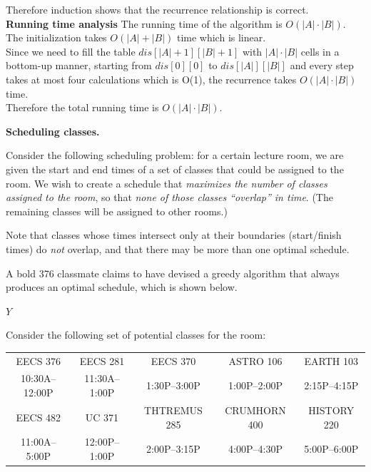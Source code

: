 \documentclass[11pt,addpoints]{exam}
\begin{document}
\begin{questions}
\begin{solution}
    Therefore induction shows that the recurrence relationship is correct.\\

    \textbf{Running time analysis}
    The running time of the algorithm is $O(|A| \cdot |B|)$.
    The initialization takes $O(|A|+|B|)$ time which is linear.\\
    Since we need to fill the table $dis[|A|+1][|B|+1]$ with $|A| \cdot |B|$ cells in a bottom-up manner, starting from $dis[0][0]$ to $dis[|A|][|B|]$ and every step takes at most four calculations which is O(1), the recurrence takes $O(|A| \cdot |B|)$ time. \\
    Therefore the total running time is $O(|A| \cdot |B|)$.
    \end{solution}

\question \textbf{Scheduling classes.}

Consider the following scheduling problem: for a certain lecture room, we are given the start and end times of a set of classes that could be assigned to the room.
  We wish to create a schedule that \emph{maximizes the number of classes assigned to the room}, so that \emph{none of those classes ``overlap'' in time}.
  (The remaining classes will be assigned to other rooms.)

  Note that classes whose times intersect only at their boundaries (start/finish times) do \emph{not} overlap, and that there may be more than one optimal schedule.
  
  A bold 376 classmate claims to have devised a greedy algorithm that always produces an optimal schedule, which is shown below.

  \begin{minipage}{\linewidth}
    \begin{algorithm}[H]
      \begin{algorithmic}[1]
        \EndIf{}
        \EndFor{}
        \State \Return{} \(Y\)
        \EndFunction{}
      \end{algorithmic}
    \end{algorithm}
  \end{minipage}
  
  Consider the following set of potential classes for the room:
  \begin{center}
    \begin{tabular}{|c|c|c|c|c|} \hline
      EECS 376 & EECS 281 & EECS 370 & ASTRO 106 & EARTH 103  \\
      10:30A--12:00P & 11:30A--1:00P & 1:30P--3:00P & 1:00P--2:00P & 2:15P--4:15P \\ \hline
      EECS 482 & UC 371 & THTREMUS 285 & CRUMHORN 400 & HISTORY 220 \\
      11:00A--5:00P & 12:00P--1:00P & 2:00P--3:15P & 4:00P--4:30P & 5:00P--6:00P \\ \hline
    \end{tabular}
  \end{center}


\end{questions}
\end{document}
